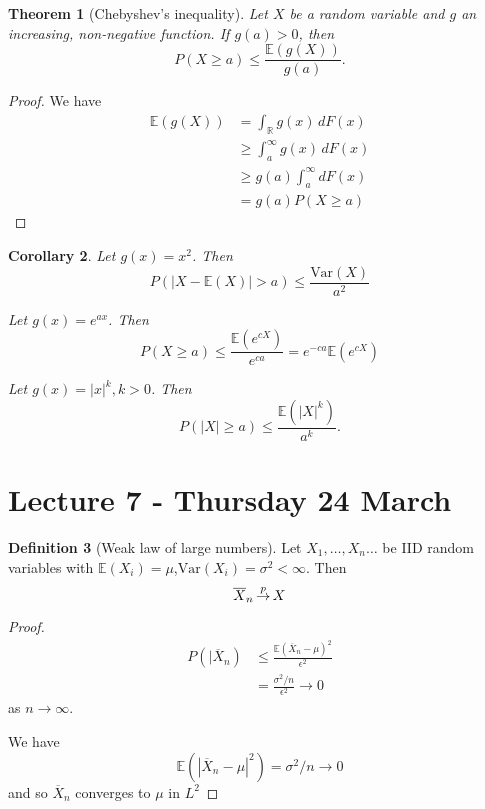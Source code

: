 \documentclass[10pt, oneside, reqno]{amsart}
\theoremstyle{plain}%
\newtheorem{thm}{Theorem}[section]
\newtheorem{cor}[thm]{Corollary}
\theoremstyle{definition}
\newtheorem{defn}[thm]{Definition}
\theoremstyle{remark}
\newcommand{\var}{\text{Var}}
\newcommand{\R}{\mathbb{R}}
\newcommand{\E}{\mathbb{E}}
\def\cip{\,{\buildrel p \over \rightarrow}\,}
\begin{document}
\begin{thm}[Chebyshev's inequality]
    Let $X$ be a random variable and $g$ an increasing, non-negative function.  If $g(a) > 0$, then $$ P(X \geq a) \leq \frac{\E(g(X))}{g(a)}.$$
\end{thm}

\begin{proof}
    We have  \begin{align*}
        \E(g(X)) &= \int_\R g(x) \, dF(x) \\
                &\geq \int_a^\infty g(x) \, dF(x) \\
                &\geq g(a) \int_a^\infty dF(x) \\
                &= g(a) P(X \geq a) 
    \end{align*}
\end{proof}

\begin{cor}
    Let $g(x) = x^2$.  Then\[
        P( | X - \E(X) | > a) \leq \frac{\text{Var}(X)}{a^2}
    \]

    Let $g(x) = e^{ax}$.  Then \[
        P(X \geq a) \leq \frac{\E(e^{cX})}{e^{ca}} = e^{-ca} \E(e^{cX})
    \]
    
    Let $g(x) = |x|^k, k > 0$. Then \[
        P(|X| \geq a) \leq \frac{\E(|X|^k)}{a^k}.
    \]
\end{cor}

\section{Lecture 7 - Thursday 24 March} %
\label{sec:lecture_7_thursday_24_march}
\begin{defn}[Weak law of large numbers]
    Let $X_1, \dots, X_n \dots$ be IID random variables with $\E(X_i) = \mu$,$ \var(X_i) = \sigma^2 < \infty$.  Then \[
        \overline{X}_n \cip X
    \]
\end{defn}

\begin{proof}
    \begin{align*}
        P(|\overline{X}_n) &\leq \frac{\E(\overline{X}_n - \mu)^2}{\epsilon^2} \\
                            &= \frac{\sigma^2/n}{\epsilon^2} \rightarrow 0
    \end{align*} as $n \rightarrow \infty$.  
    
    We have \[
        \E(|\overline{X}_n - \mu|^2) = \sigma^2/n \rightarrow 0
    \] and so $\overline{X}_n$ converges to $\mu$ in $L^2$
\end{proof}
\end{document}
